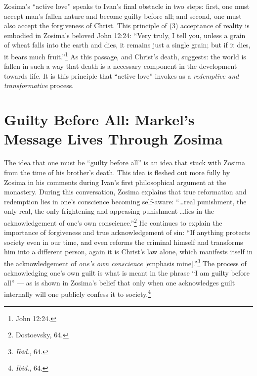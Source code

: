 Zosima's ``active love'' speaks to Ivan's final obstacle in two steps: first, one must accept man's fallen nature and become guilty before all; and second, one must also accept the forgiveness of Christ. This principle of (3) acceptance of reality is embodied in Zosima's beloved John 12:24: ``Very truly, I tell you, unless a grain of wheat falls into the earth and dies, it remains just a single grain; but if it dies, it bears much fruit.''\footnote{John 12:24.} As this passage, and Christ's death, suggests: the world is fallen in such a way that death is a necessary component in the development towards life. It is this principle that ``active love'' invokes as a \emph{redemptive and transformative} process.

\section{Guilty Before All: Markel's Message Lives Through Zosima}
The idea that one must be ``guilty before all'' is an idea that stuck with Zosima from the time of his brother's death. This idea is fleshed out more fully by Zosima in his comments during Ivan's first philosophical argument at the monastery. During this conversation, Zosima explains that true reformation and redemption lies in one's conscience becoming self-aware: ``\ldots real punishment, the only real, the only frightening and appeasing punishment \ldots lies in the acknowledgement of one's own conscience.''\footnote{Dostoevsky, 64.} He continues to explain the importance of forgiveness and true acknowledgement of sin: ``If anything protects society even in our time, and even reforms the criminal himself and transforms him into a different person, again it is Christ's law alone, which manifests itself in the acknowledgement of \emph{one's own conscience} [emphasis mine].''\footnote{\emph{Ibid.}, 64.} The process of acknowledging one's own guilt is what is meant in the phrase ``I am guilty before all'' --- as is shown in Zosima's belief that only when one acknowledges guilt internally will one publicly confess it to society.\footnote{\emph{Ibid.}, 64.}

